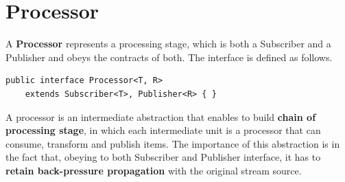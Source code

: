 \section{Processor}\label{processor}

A \textbf{Processor} represents a processing stage, which is both a
Subscriber and a Publisher and obeys the contracts of both. The
interface is defined as follows.

\begin{verbatim}
public interface Processor<T, R>
    extends Subscriber<T>, Publisher<R> { }
\end{verbatim}

A processor is an intermediate abstraction that enables to build
\textbf{chain of processing stage}, in which each intermediate unit is a
processor that can consume, transform and publish items. The importance
of this abstraction is in the fact that, obeying to both Subscriber and
Publisher interface, it has to \textbf{retain back-pressure
propagation} with the original stream source.



